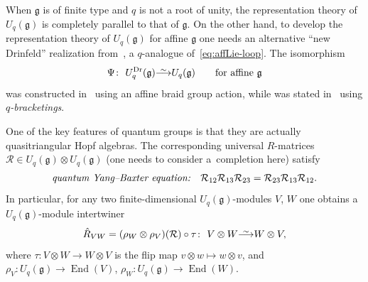 \documentclass[pdftex]{sigma}
\numberwithin{equation}{section}
\DeclareMathOperator{\End}{End}
\newcommand{\fg}{\mathfrak{g}}
\newcommand\iso{ \vphantom{j^{X^2}}\smash{\overset{\sim}{\vphantom{\rule{0pt}{0.20em}}\smash{\longrightarrow}}} }
\begin{document}
When $\fg$ is of finite type and $q$ is not a root of unity, the representation theory of $U_q(\fg)$ is completely parallel to that of $\fg$. On the other hand, to develop the representation theory of $U_q(\fg)$ for affine $\fg$ one needs an alternative ``new Drinfeld'' realization \smash{$U^{\mathrm{Dr}}_q(\fg)$} from~\cite{D}, a $q$-analogue of~\eqref{eq:affLie-loop}. The isomorphism
\begin{equation}\label{eq:Dr-to-DJ-intro}
 \Psi\colon\ U^{\mathrm{Dr}}_q(\fg)\iso U_q(\fg) \qquad \text{for affine} \ \fg
\end{equation}
was constructed in~\cite{B} using an affine braid group action, while  was stated in~\cite{D} using \textit{$q$-bracketings}.

One of the key features of quantum groups is that they are actually quasitriangular Hopf algebras. The corresponding universal $R$-matrices $\mathcal{R}\in U_q(\fg)\otimes U_q(\fg)$ (one needs to consider a~completion here) satisfy
\begin{equation}\label{eq:qYB-intro}
 \text{\textit{quantum Yang--Baxter equation:}}
 \quad \mathcal{R}_{12}\mathcal{R}_{13}\mathcal{R}_{23}=\mathcal{R}_{23}\mathcal{R}_{13}\mathcal{R}_{12}.
\end{equation}
In particular, for any two finite-dimensional $U_q(\fg)$-modules $V$, $W$ one obtains a $U_q(\fg)$-module intertwiner
\begin{equation}\label{eq:intertwiner-intro}
 \hat{R}_{VW}=(\rho_W\otimes \rho_V)(\mathcal{R})\circ \tau\colon\ V\otimes W \iso W\otimes V,
\end{equation}
where $\tau\colon V\otimes W\to W\otimes V$ is the flip map $v\otimes w\mapsto w\otimes v$, and $\rho_V\colon U_q(\fg)\to \End(V)$, $\rho_W\colon U_q(\fg)\to \End(W)$.
\end{document}
